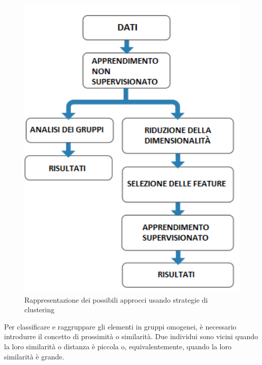 \begin{figure}[]
	\centering
	\includegraphics[width=1\textwidth]{images/Approcci_Clustering.png}
	\caption{Rappresentazione dei possibili approcci usando strategie di clustering}
\end{figure}
Per classificare e raggruppare gli elementi in gruppi omogenei, è necessario introdurre il concetto di prossimità o similarità. Due individui sono vicini quando la loro similarità o distanza è piccola o, equivalentemente, quando la loro similarità è grande.

